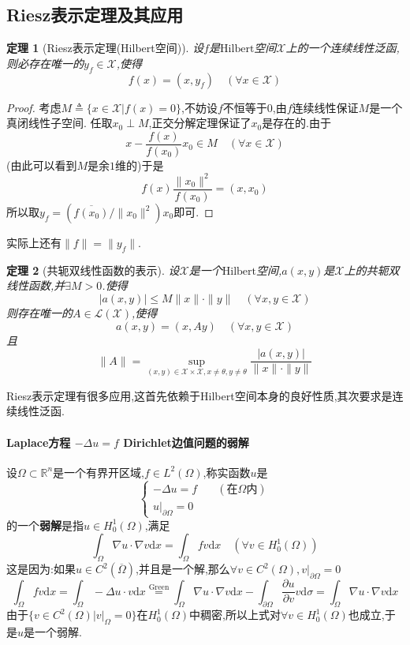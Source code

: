 \documentclass[12pt,a4paper]{article}
\newtheorem{thm}{定理}[subsection]  %
\begin{document}
\subsection{Riesz表示定理及其应用}
\begin{thm}[Riesz表示定理(Hilbert空间)]
    设$f$是$\mathrm{Hilbert}$空间$\mathscr{X}$上的一个连续线性泛函,则必存在唯一的$y_f \in \mathscr{X}$,使得
    \[f(x) = (x,y_f)\quad (\forall x \in \mathscr{X})\]
\end{thm}
\begin{proof}
    考虑$M\triangleq \{x\in \mathscr{X}|f(x) = 0\}$,不妨设$f$不恒等于$0$,由$f$连续线性保证$M$是一个真闭线性子空间.
    任取$x_0 \perp M$,正交分解定理保证了$x_0$是存在的.由于\[x-\frac{f(x)}{f(x_0)}x_0 \in M \quad (\forall x \in \mathscr{X})\]
    (由此可以看到$M$是余$1$维的)于是\[f(x)\frac{\|x_0\|^2}{f(x_0)} = (x,x_0)\]所以取$y_f = (\overline{f(x_0)}/\|x_0\|^2) x_0$即可.
\end{proof}
实际上还有$\|f\| = \|y_f\|$.
\begin{thm}[共轭双线性函数的表示]
    设$\mathscr{X}$是一个$\mathrm{Hilbert}$空间,$a(x,y)$是$\mathscr{X}$上的共轭双线性函数,并$\exists M>0$.使得
    \[|a(x,y)| \leq M\|x\|\cdot \|y\|\quad (\forall x,y \in \mathscr{X})\]
    则存在唯一的$A \in \mathscr{L}(\mathscr{X})$,使得\[a(x,y) = (x,Ay) \quad (\forall x,y \in \mathscr{X})\]
    且\[\|A\| = \underset{(x,y) \in \mathscr{X}\times \mathscr{X}, x \neq \theta, y \neq \theta}{\sup}\frac{|a(x,y)|}{\|x\|\cdot \|y\|} \]
\end{thm}
Riesz表示定理有很多应用,这首先依赖于\rm{Hilbert}空间本身的良好性质,其次要求是连续线性泛函.

\paragraph{Laplace方程 $-\Delta u = f$ Dirichlet边值问题的弱解}\mbox{} 

设$\Omega\subset \mathbb{R}^n$是一个有界开区域,$f\in L^2(\Omega)$,称实函数$u$是
\begin{equation}\begin{cases}
    -\Delta u = f &\quad (\text{在}\Omega \text{内})\\u|_{\partial \Omega} = 0&
\end{cases}\tag{\#} \end{equation}
的一个\textbf{弱解}是指$u \in H_0^1(\Omega)$,满足
\[\int_{\Omega} \nabla u \cdot \nabla v \mathrm{d}x = \int_{\Omega}fv\mathrm{d}x \quad (\forall v \in H_0^1(\Omega))\]
这是因为:如果$u \in C^2(\overline{\Omega})$,并且是一个解,那么$\forall v \in C^2(\Omega),v|_{\partial \Omega} = 0$
\[\int_{\Omega}fv\mathrm{d}x = \int_{\Omega}-\Delta u \cdot v\mathrm{d}x 
\overset{\mathrm{Green}}{=} \int_{\Omega}\nabla u \cdot \nabla v \mathrm{d}x - \int_{\partial \Omega} \frac{\partial u}{\partial v} v \mathrm{d}\sigma
= \int_{\Omega}\nabla u \cdot \nabla v \mathrm{d}x\]
由于$\{v \in C^2(\Omega)|v|_{\Omega} = 0\}$在$H_0^1(\Omega)$中稠密,所以上式对$\forall v\in H_0^1(\Omega)$也成立,于是$u$是一个弱解.
\end{document}
